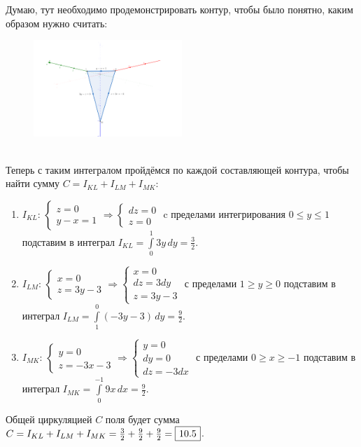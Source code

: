 \documentclass[a3paper,14pt]{extarticle}
\newcommand*\squared[1]{\tikz[baseline=(char.base)]{
            \node[shape=rectangle,draw,inner sep=4pt] (char) {#1};}}
\begin{document}
\pagebreak\noindent Думаю, тут необходимо продемонстрировать контур, чтобы было понятно, каким образом нужно считать:
\begin{figure}[h]
    \centering\includegraphics[width=0.5\textwidth]{5.3.png}
\end{figure} \,\\[1em]
Теперь с таким интегралом пройдёмся по каждой составляющей контура, чтобы найти сумму $C = I_{KL} + I_{LM} + I_{MK}$:
\begin{enumerate}
    \item $I_{KL}$: $\begin{cases}
        z = 0 \\ y-x = 1
    \end{cases} \Rightarrow \begin{cases}
        dz = 0 \\ z = 0
    \end{cases}$ c пределами интегрирования $0 \le y \le 1$ подставим в интеграл $I_{KL} = \int\limits_0^1 3y\,dy = \frac{3}{2}$.
    \item $I_{LM}$: $\begin{cases}
        x = 0 \\ z = 3y - 3
    \end{cases} \Rightarrow \begin{cases}
        x = 0 \\ dz = 3dy \\ z = 3y - 3
    \end{cases}$ с пределами $1 \ge y \ge 0$ подставим в интеграл $I_{LM} = \int\limits_1^0 (-3y-3)\,dy = \frac{9}{2}$.
    \item $I_{MK}$: $\begin{cases}
        y = 0 \\ z = -3x - 3
    \end{cases} \Rightarrow \begin{cases}
        y = 0 \\ dy = 0 \\ dz = -3dx
    \end{cases}$ с пределами $0 \ge x \ge -1$ подставим в интеграл $I_{MK} = \int\limits_0^{-1} 9x\,dx = \frac{9}{2}$.
\end{enumerate}
Общей циркуляцией $C$ поля будет сумма $C = I_{KL} + I_{LM} + I_{MK} = \frac{3}{2} + \frac{9}{2} + \frac{9}{2} = \squared{$10.5$}$.
\end{document}
